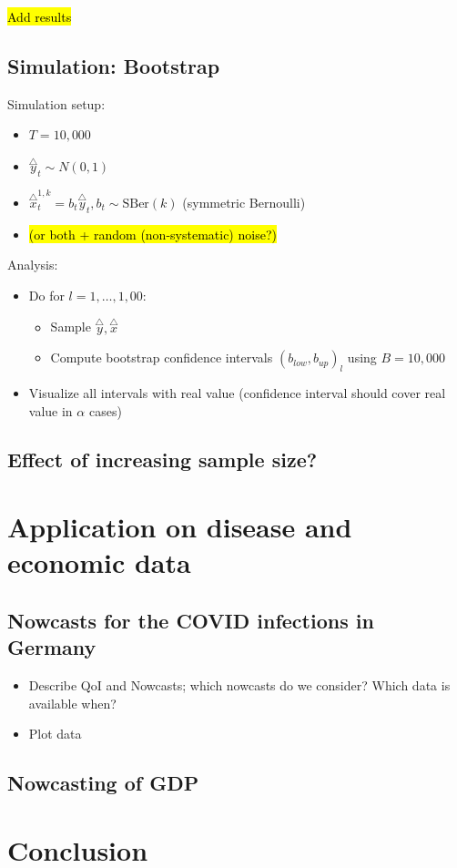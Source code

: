 \documentclass[oneside]{article}
\theoremstyle{plain}%
\theoremstyle{definition}
\newcommand{\ydiff}{\overset{\triangle}{y}}
\newcommand{\xdiff}{\overset{\triangle}{x}}
\newcommand{\SBer}{\text{SBer}}
\begin{document}
\hl{Add results}

\subsection{Simulation: Bootstrap}

Simulation setup:

\begin{itemize}
  \item $T = 10,000$
  \item $\ydiff_t \sim N(0, 1)$ 
  \item $\xdiff_t^{1, k} = b_t  \ydiff_t, b_t \sim \SBer(k)$ (symmetric Bernoulli)
  \item \hl{(or both + random (non-systematic) noise?)}
\end{itemize}

Analysis:
\begin{itemize}
\item Do for $l = 1, \dots, 1,00$:
\begin{itemize}
  \item Sample $\ydiff, \xdiff$
  \item Compute bootstrap confidence intervals $(b_{low}, b_{up})_l$ using $B = 10,000$
\end{itemize}
  \item Visualize all intervals with real value (confidence interval should cover real value in $\alpha$ cases)
\end{itemize}



\subsection{Effect of increasing sample size?}

\section{Application on disease and economic data}

\subsection{Nowcasts for the COVID infections in Germany}

\begin{itemize}
  \item Describe QoI and Nowcasts; which nowcasts do we consider? Which data is available when?
  \item Plot data
\end{itemize}

\subsection{Nowcasting of GDP}

\section{Conclusion}
\end{document}
